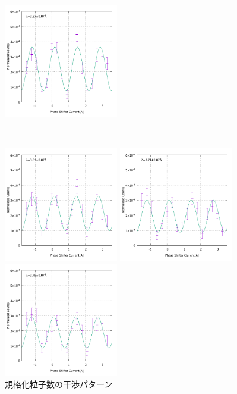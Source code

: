 \begin{figure}[h]
\begin{minipage}{0.33\hsize}
\end{minipage}
\begin{minipage}{0.33\hsize}
\includegraphics[width=5cm]{discussion/IF_nb/Interference_nb_fit500.pdf}
\end{minipage}\\
\begin{minipage}{0.33\hsize}
\includegraphics[width=5cm]{discussion/IF_nb/Interference_nb_fit510.pdf}
\end{minipage}
\begin{minipage}{0.33\hsize}
\includegraphics[width=5cm]{discussion/IF_nb/Interference_nb_fit520.pdf}
\end{minipage}
\begin{minipage}{0.33\hsize}
\includegraphics[width=5cm]{discussion/IF_nb/Interference_nb_fit530.pdf}
\end{minipage}
\caption{規格化粒子数の干渉パターン}\label{Discussion2_fig_IF_nb}
\end{figure}

